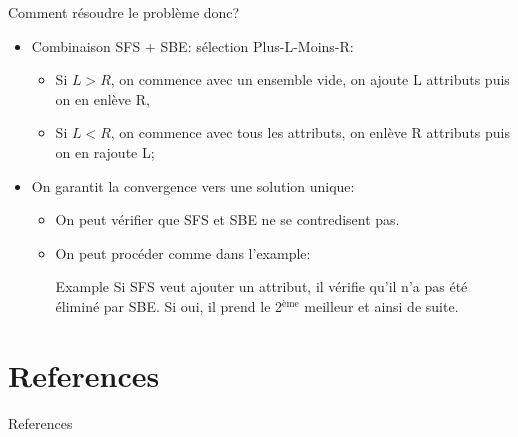 \documentclass[9pt]{beamer}
\begin{document}
	\begin{frame}{Comment résoudre le problème donc?}
		\begin{itemize}
			\item<1-> Combinaison SFS + SBE\@: sélection Plus-L-Moins-R\@:
			\begin{itemize}
				\item Si $L > R$, on commence avec un ensemble vide, on ajoute L attributs puis on en enlève R\@,
				\item Si $L < R$, on commence avec tous les attributs, on enlève R attributs puis on en rajoute L\@;
			\end{itemize}
			\item<2-> On garantit la convergence vers une solution unique:
			\begin{itemize}
				\item On peut vérifier que SFS et SBE ne se contredisent pas.
				\item On peut procéder comme dans l'example:
				\begin{block}{Example}
					Si SFS veut ajouter un attribut, il vérifie qu'il n'a pas été éliminé par SBE\@. Si oui, il prend le 2$^{\text{ème}}$ meilleur et ainsi de suite.
				\end{block}
			\end{itemize}
		\end{itemize}
	\end{frame}

	\section*{References}
	\begin{frame}[allowframebreaks]{References}
		\nocite{sklearn_api}
		
		
	\end{frame}
\end{document}
